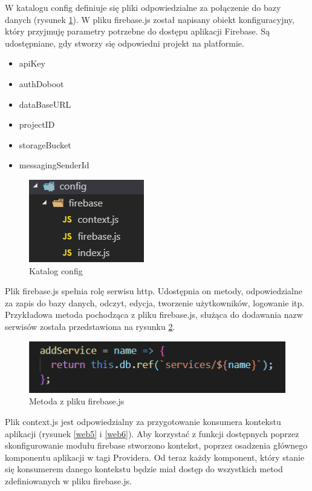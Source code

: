 \documentclass[12pt]{article}
\begin{document}
W katalogu config definiuje się pliki odpowiedzialne za połączenie do bazy danych (rysunek \ref{web3}). W pliku firebase.js został napisany obiekt konfiguracyjny, który przyjmuję parametry potrzebne do dostępu aplikacji Firebase. Są udostępniane, gdy stworzy się odpowiedni projekt na platformie. 
\begin{itemize}
\item	apiKey
\item	authDoboot
\item	dataBaseURL
\item	projectID
\item	storageBucket
\item	messagingSenderId
\end{itemize}
 \begin{figure}[H]
		\centering
		\includegraphics[scale=1]{web3.png}
		\caption{Katalog config}
		\label{web3}
	\end{figure}
	
Plik firebase.js spełnia rolę serwisu http. Udostępnia on metody, odpowiedzialne za zapis do bazy danych, odczyt, edycja, tworzenie użytkowników, logowanie itp. Przykładowa metoda pochodząca z pliku firebase.js, służąca do dodawania nazw serwisów została przedstawiona na rysunku \ref{web4}.

 \begin{figure}[H]
		\centering
		\includegraphics[scale=1]{web4.png}
		\caption{Metoda z pliku firebase.js}
		\label{web4}
	\end{figure}
	
	Plik context.js jest odpowiedzialny za przygotowanie konsumera kontekstu aplikacji (rysunek \ref{web5} i \ref{web6}). Aby korzystać z funkcji dostępnych poprzez skonfigurowanie modułu firebase stworzono kontekst, poprzez osadzenia głównego komponentu aplikacji w tagi Providera. Od teraz każdy komponent, który stanie się konsumerem danego kontekstu będzie miał dostęp do wszystkich metod zdefiniowanych w pliku firebase.js. 
	
\end{document}
